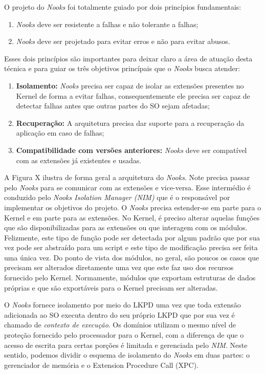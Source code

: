 O projeto do \emph{Nooks} foi totalmente guiado por dois princípios
fundamentais:
\begin{enumerate}
	\item \emph{Nooks} deve ser resistente a falhas e não tolerante a falhas;
	\item \emph{Nooks} deve ser projetado para evitar erros e não para evitar
				abusos.
\end{enumerate}
Esses dois princípios são importantes para deixar claro a área de atuação desta
técnica e para guiar os três objetivos princípais que o \emph{Nooks} busca
atender:
\begin{enumerate}
	\item \textbf{Isolamento:} \emph{Nooks} precisa ser capaz de isolar as
				extensões presentes no Kernel de forma a evitar falhas, consequentemente
				ele precisa ser capaz de detectar falhas antes que outras partes do
				SO sejam afetadas;
	\item \textbf{Recuperação:} A arquitetura precisa dar suporte para a
				recuperação da aplicação em caso de falhas;
	\item \textbf{Compatibilidade com versões anteriores:} \emph{Nooks} deve ser
				compatível com as extensões já existentes e usadas.
\end{enumerate}


A Figura X ilustra de forma geral a arquitetura do \emph{Nooks}. Note precisa
passar pelo \emph{Nooks} para se comunicar com as extensões e vice-versa. Esse
intermédio é conduzido pelo \emph{Nooks Isolation Manager (NIM)} que é o
responsável por implementar os objetivos do projeto. O \emph{Nooks} precisa
estender-se em parte para o Kernel e em parte para as extensões. No Kernel, é
preciso alterar aquelas funções que são disponibilizadas para as extensões ou
que interagem com os módulos. Felizmente, este tipo de função pode ser
detectada por algum padrão que por sua vez pode ser abstraído para um script e
este tipo de modificação precisa ser feita uma única vez. Do ponto de vista dos
módulos, no geral, são poucos os casos que precisam ser alterados diretamente
uma vez que este faz uso dos recursos fornecido pelo Kernel. Normamente,
módulos que exportam estruturas de dados próprias e que são exportáveis para o
Kernel precisam ser alteradas.

O \emph{Nooks} fornece isolamento por meio do LKPD uma vez que toda extensão
adicionada ao SO executa dentro do seu próprio LKPD que por sua vez é chamado
de \emph{contexto de execução}. Os domínios utilizam o mesmo nível de proteção
fornecido pelo processador para o Kernel, com a diferença de que o acesso de
escrita para certas porções é limitada e gerenciada pelo \emph{NIM}. Neste
sentido, podemos dividir o esquema de isolamento do \emph{Nooks} em duas partes:
o gerenciador de memória e o Extension Procedure Call (XPC).

